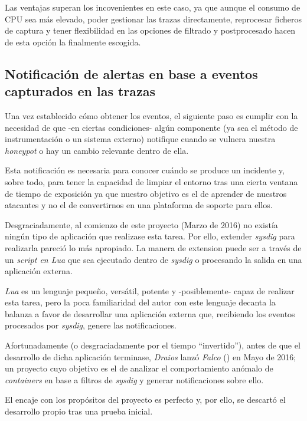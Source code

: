 Las ventajas superan los incovenientes en este caso, ya que aunque el consumo de CPU sea más elevado, poder gestionar las trazas directamente, reprocesar ficheros de captura y tener flexibilidad en las opciones de filtrado y postprocesado hacen de esta opción la finalmente escogida.

\subsection{Notificación de alertas en base a eventos capturados en las trazas}
\label{subsec:alertas-trazas}

Una vez establecido cómo obtener los eventos, el siguiente paso es cumplir con la necesidad de que -en ciertas condiciones- algún componente (ya sea el método de instrumentación o un sistema externo) notifique cuando se vulnera nuestra \emph{honeypot} o hay un
cambio relevante dentro de ella.

Esta notificación es necesaria para conocer cuándo se produce un incidente y, sobre todo, para tener la capacidad de limpiar el entorno tras una
cierta ventana de tiempo de exposición ya que nuestro objetivo es el de aprender de nuestros atacantes y no el de convertirnos en una plataforma de soporte
para ellos.

Desgraciadamente, al comienzo de este proyecto (Marzo de 2016) no existía ningún tipo de aplicación que realizase esta tarea.
Por ello, extender \emph{sysdig} para realizarla pareció lo más apropiado. La manera de extension puede ser a través de un
\emph{script en Lua} que sea ejecutado dentro de \emph{sysdig} o procesando la salida en una aplicación externa.

\emph{Lua} es un lenguaje pequeño, versátil, potente y -posiblemente- capaz de realizar esta tarea, pero la poca familiaridad del autor con este lenguaje decanta
la balanza a favor de desarrollar una aplicación externa que, recibiendo los eventos procesados por \emph{sysdig}, genere las notificaciones.

Afortunadamente (o desgraciadamente por el tiempo ``invertido''), antes de que el desarrollo de dicha aplicación terminase, \emph{Draios} lanzó \emph{Falco} (\cite{falco-project}) en Mayo de 2016; un proyecto cuyo objetivo
es el de analizar el comportamiento anómalo de \emph{containers} en base a filtros de \emph{sysdig} y generar notificaciones sobre ello.

El encaje con los propósitos del proyecto es perfecto y, por ello, se descartó el desarrollo propio tras una prueba inicial.

